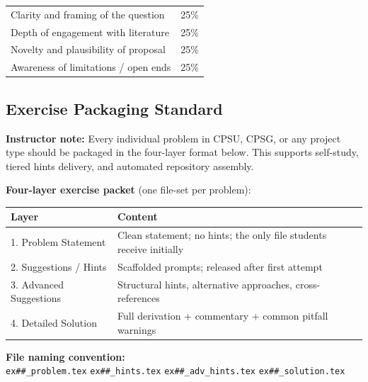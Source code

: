 \documentclass[11pt,a4paper]{article}
\newcommand{\instructornote}[1]{%
  \begin{tcolorbox}[notebox]\textbf{Instructor note:} #1\end{tcolorbox}%
}
\begin{document}
\begin{tcolorbox}[rubricbox, title={ORQ Rubric (per question)}]
\begin{tabular}{ll}
  Clarity and framing of the question  & 25\%\\
  Depth of engagement with literature  & 25\%\\
  Novelty and plausibility of proposal & 25\%\\
  Awareness of limitations / open ends & 25\%\\
\end{tabular}
\end{tcolorbox}

\newpage
\subsection{Exercise Packaging Standard}

\instructornote{Every individual problem in CPSU, CPSG, or any project type should
be packaged in the four-layer format below. This supports self-study, tiered hints
delivery, and automated repository assembly.}

\begin{tcolorbox}[goldbox]
\textbf{Four-layer exercise packet} (one file-set per problem):

\medskip
\begin{tabular}{lp{9.5cm}}
\toprule
\textbf{Layer} & \textbf{Content}\\
\midrule
1. Problem Statement    & Clean statement; no hints; the only file students receive initially\\
2. Suggestions / Hints  & Scaffolded prompts; released after first attempt\\
3. Advanced Suggestions & Structural hints, alternative approaches, cross-references\\
4. Detailed Solution    & Full derivation + commentary + common pitfall warnings\\
\bottomrule
\end{tabular}

\medskip\noindent\textbf{File naming convention:}\\
\texttt{ex\#\#\_problem.tex} \quad
\texttt{ex\#\#\_hints.tex} \quad
\texttt{ex\#\#\_adv\_hints.tex} \quad
\texttt{ex\#\#\_solution.tex}
\end{tcolorbox}

\end{document}
